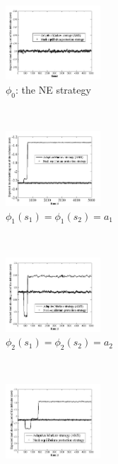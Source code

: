 \begin{figure}[t]
\setlength{\belowcaptionskip}{-12pt}
  \centering
\captionsetup[subfigure]{aboveskip=-1pt,belowskip=-7pt}~\hspace{-6em}
 \begin{subfigure}[b]{0.3\textwidth}
   \centering
                \includegraphics[width=1.4in]{result2}
                \caption{$\phi_0$: the NE strategy}
                \label{fig:NE}
        \end{subfigure}~\hspace{-6em}
 \begin{subfigure}[b]{0.3\textwidth}
   \centering
                \includegraphics[width=1.4in]{result1}
                \caption{$\phi_1(s_1)  = \phi_1(s_2) = a _1$}
                \label{fig:a1}
        \end{subfigure}~\hspace{-6em}
\begin{subfigure}[b]{0.3\textwidth}
  \centering
                \includegraphics[width=1.4in]{result3}
                \caption{$\phi_2(s_1)  = \phi_2(s_2) = a _2$}
                \label{fig:a2}
        \end{subfigure}~\hspace{-4em}
\begin{subfigure}[b]{0.3\textwidth}
  \centering
                \includegraphics[width=1.4in]{result4}

\end{subfigure}
\end{figure}
